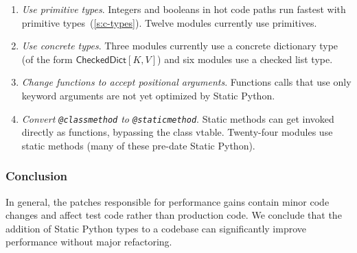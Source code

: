 \documentclass[english,cleveref,submission]{programming}
\newcommand{\SP}{Static Python}
\newcommand{\code}[1]{\texttt{#1}}
\newcommand{\ipara}[1]{\emph{#1}\/.}
\newcommand{\typefont}[1]{\mathsf{#1}}
\newcommand{\paramtype}[2]{#1[#2]}
\newcommand{\sptrawchkdict}{\typefont{CheckedDict}} %
\newcommand{\sptchkdict}[2]{\paramtype{\sptrawchkdict}{#1, #2}}
\begin{document}
\begin{enumerate}
  \item
    \ipara{Use primitive types}
    Integers and booleans in hot code paths run fastest with
    primitive types~(\cref{s:c-types}).
    Twelve modules currently use primitives.

  \item
    \ipara{Use concrete types}
    Three modules currently use a concrete dictionary type
    (of the form $\sptchkdict{K}{V}$)
    and six modules use a checked list type.

  \item
    \ipara{Change functions to accept positional arguments}
    Functions calls that use only keyword arguments are not yet optimized by \SP{}.


  \item
    \ipara{Convert \code{@classmethod} to \code{@staticmethod}}
    Static methods can get invoked directly as functions, bypassing the class vtable.
    Twenty-four modules use static methods (many of these pre-date \SP{}).


\end{enumerate}

\subsubsection{Conclusion}

In general, the patches responsible for performance gains contain minor
code changes and 
affect test code rather than production code.
We conclude that the addition of \SP{} types to a codebase can significantly
improve performance without major refactoring.
\end{document}
